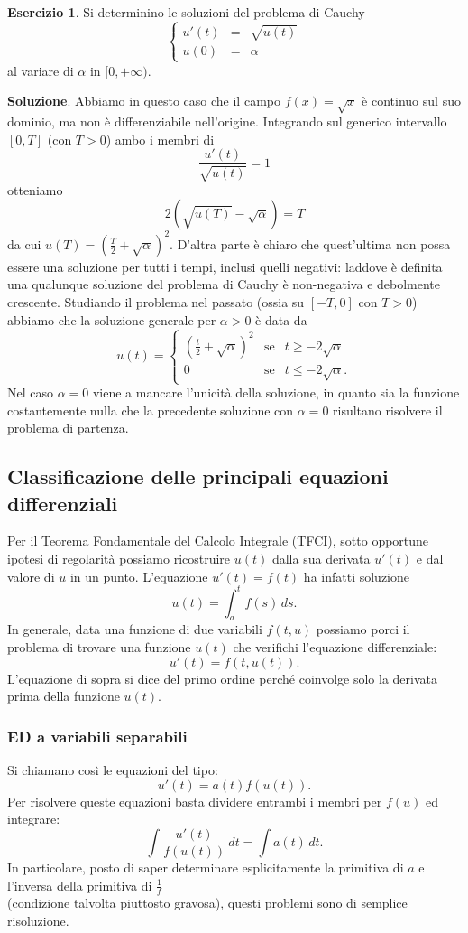 \documentclass[a4paper,twoside]{article}
\theoremstyle{definition}
\newtheorem{ex}[theorem]{Esercizio}
\numberwithin{theorem}{section}
\begin{document}
\begin{ex} Si determinino le soluzioni del problema di Cauchy
$$\left\{\begin{array}{rcl}u'(t)&=&\sqrt{u(t)}\\ u(0)&=&\alpha    \end{array}\right. $$
al variare di $\alpha$ in $[0,+\infty)$.
\end{ex}
\textbf{Soluzione}. Abbiamo in questo caso che il campo $f(x)=\sqrt{x}$ è continuo sul suo dominio, ma non è differenziabile nell'origine. Integrando sul generico intervallo $[0,T]$ (con $T>0$) ambo i membri di 
$$ \frac{u'(t)}{\sqrt{u(t)}} = 1 $$
otteniamo 
$$ 2\left(\sqrt{u(T)}-\sqrt{\alpha}\right) = T $$
da cui $u(T)=\left(\frac{T}{2}+\sqrt{\alpha}\right)^2$. D'altra parte è chiaro che quest'ultima non possa essere una soluzione per tutti i tempi, inclusi quelli negativi: laddove è definita una qualunque soluzione del problema di Cauchy è non-negativa e debolmente crescente. Studiando il problema nel passato (ossia su $[-T,0]$ con $T>0$) abbiamo che la soluzione generale per $\alpha>0$ è data da 
$$ u(t) = \left\{\begin{array}{rcl}\left(\frac{t}{2}+\sqrt{\alpha}\right)^2 &\text{se}& t\geq -2\sqrt{\alpha} \\ 0 & \text{se} & t\leq -2\sqrt{\alpha}. \end{array}\right. $$
Nel caso $\alpha=0$ viene a mancare l'unicità della soluzione, in quanto sia la funzione costantemente nulla che la precedente soluzione con $\alpha=0$ risultano risolvere il problema di partenza.



\subsection{Classificazione delle principali equazioni differenziali}
Per il Teorema Fondamentale del Calcolo Integrale (TFCI), sotto opportune ipotesi di regolarità possiamo ricostruire $u(t)$ dalla sua derivata $u'(t)$ e dal valore di $u$ in un punto. L'equazione $u'(t)=f(t)$ ha infatti soluzione $$u(t)=\int_{a}^{t}f(s)\,ds.$$
In generale, data una funzione di due variabili $f(t,u)$ possiamo porci il problema di trovare una funzione $u(t)$ che verifichi l'equazione differenziale:$$u'(t)=f(t,u(t)).$$
L'equazione di sopra si dice del primo ordine perché coinvolge solo la derivata prima della funzione $u(t)$.
\subsubsection{ED a variabili separabili}
Si chiamano così le equazioni del tipo: $$u'(t)=a(t)f(u(t)).$$ 
Per risolvere queste equazioni basta dividere entrambi i membri per $f(u)$ ed integrare: $$\int\frac{u'(t)}{f(u(t))}\,dt=\int a(t)\,dt.$$
In particolare, posto di saper determinare esplicitamente la primitiva di $a$ e  l'inversa della primitiva di $\frac{1}{f}$\\ (condizione talvolta piuttosto gravosa), questi problemi sono di semplice risoluzione.
\end{document}
